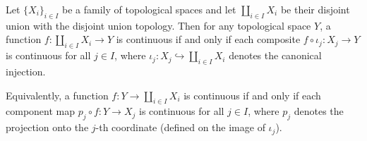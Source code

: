 \begin{proposition} \label{proposition:universal_property_of_disjoint_union_topology}
    Let $\{X_i\}_{i \in I}$ be a family of topological spaces and let $\coprod_{i \in I} X_i$ be their disjoint union with the disjoint union topology. Then for any topological space $Y$, a function $f : \coprod_{i \in I} X_i \to Y$ is continuous if and only if each composite $f \circ \iota_j : X_j \to Y$ is continuous for all $j \in I$, where $\iota_j : X_j \hookrightarrow \coprod_{i \in I} X_i$ denotes the canonical injection.

    Equivalently, a function $f : Y \to \coprod_{i \in I} X_i$ is continuous if and only if each component map $p_j \circ f : Y \to X_j$ is continuous for all $j \in I$, where $p_j$ denotes the projection onto the $j$-th coordinate (defined on the image of $\iota_j$).
\end{proposition}
